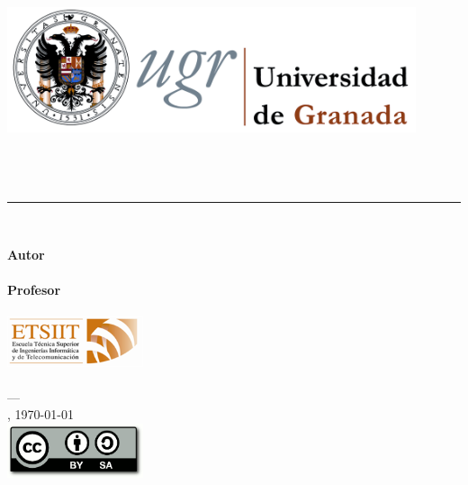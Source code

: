 \begin{titlepage}

\newlength{\centeroffset}
\setlength{\centeroffset}{-0.5\oddsidemargin}
\addtolength{\centeroffset}{0.5\evensidemargin}

\noindent\hspace*{\centeroffset}\begin{minipage}{\textwidth}

\centering
\includegraphics[width=0.9\textwidth]{../images/logo_ugr.png}\\[1.4cm]

\textsc{\Large\asunto\\[0.2cm]}
\textsc{\grado}\\[1cm]

{\Huge\bfseries \titulo\\}
\noindent\rule[-1ex]{\textwidth}{3pt}\\[3.5ex]

\centering

\textbf{Autor}\\ {\autor}\\[2.5ex]
\textbf{Profesor}\\ {\profesor}\\[2cm]
\includegraphics[width=0.3\textwidth]{../images/logo_etsiit.png}\\[0.1cm]
\textsc{\escuela}\\
\textsc{---}\\
\ciudad, \today\\
\includegraphics[width=0.3\textwidth]{../images/CC-SA-logo.png}
\end{minipage}
\end{titlepage}